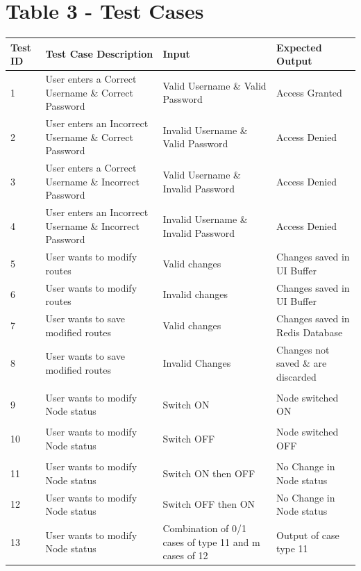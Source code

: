 \documentclass[12pt,a4paper,final]{report}
\begin{document}
\section*{Table 3 - Test Cases}
\begin{table}[!ht]
	\centering
	\begin{tabular}{| p{1cm} | p{7cm} | p{4cm} | p{4cm} |}
		\toprule
		\textbf{Test ID} & \textbf{Test Case Description} & \textbf{Input} & \textbf{Expected Output} \\
		\midrule
		1 & User enters a Correct Username \& Correct Password & Valid Username \& Valid Password & Access Granted \\
		\hline
		2 & User enters an Incorrect Username \& Correct Password & Invalid Username \& Valid Password & Access Denied \\
		\hline
		3 & User enters a Correct Username \& Incorrect Password & Valid Username \& Invalid Password & Access Denied \\
		\hline
		4 & User enters an Incorrect Username \& Incorrect Password & Invalid Username \& Invalid Password & Access Denied \\
		\hline
		5 & User wants to modify routes & Valid changes & Changes saved in UI Buffer\\
		\hline
		6 & User wants to modify routes & Invalid changes & Changes saved in UI Buffer \\
		\hline
		7 & User wants to save modified routes & Valid changes & Changes saved in Redis Database \\
		\hline
		8 & User wants to save modified routes & Invalid Changes & Changes not saved \& are discarded \\
		\hline
		& & & \\
		9 & User wants to modify Node status & Switch ON & Node switched ON \\
		\hline
		& & & \\
		10 & User wants to modify Node status & Switch OFF & Node switched OFF \\
		\hline
		& & & \\
		11 & User wants to modify Node status & Switch ON then OFF & No Change in Node status \\
		\hline
		12 & User wants to modify Node status & Switch OFF then ON & No Change in Node status \\
		\hline
		13 & User wants to modify Node status & Combination of 0/1 cases of type 11 and m cases of 12 & Output of case type 11 \\
		\bottomrule
	\end{tabular}
\end{table}
\end{document}
